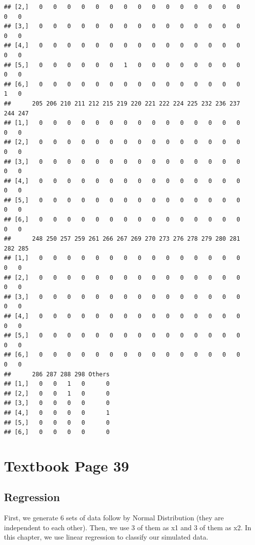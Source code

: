 \documentclass{article}\usepackage[]{graphicx}\usepackage[]{color}
\makeatletter
\newenvironment{kframe}{%
 \def\at@end@of@kframe{}%
 \ifinner\ifhmode%
  \def\at@end@of@kframe{\end{minipage}}%
  \begin{minipage}{\columnwidth}%
 \fi\fi%
 \def\FrameCommand##1{\hskip\@totalleftmargin \hskip-\fboxsep
 \colorbox{shadecolor}{##1}\hskip-\fboxsep
     \hskip-\linewidth \hskip-\@totalleftmargin \hskip\columnwidth}%
 \MakeFramed {\advance\hsize-\width
   \@totalleftmargin\z@ \linewidth\hsize
   \@setminipage}}%
 {\par\unskip\endMakeFramed%
 \at@end@of@kframe}
\newenvironment{knitrout}{}{} %
\makeatother
\begin{document}
\begin{knitrout}
\begin{kframe}
\begin{verbatim}
## [2,]   0   0   0   0   0   0   0   0   0   0   0   0   0   0   0   0   0
## [3,]   0   0   0   0   0   0   0   0   0   0   0   0   0   0   0   0   0
## [4,]   0   0   0   0   0   0   0   0   0   0   0   0   0   0   0   0   0
## [5,]   0   0   0   0   0   0   1   0   0   0   0   0   0   0   0   0   0
## [6,]   0   0   0   0   0   0   0   0   0   0   0   0   0   0   0   1   0
##      205 206 210 211 212 215 219 220 221 222 224 225 232 236 237 244 247
## [1,]   0   0   0   0   0   0   0   0   0   0   0   0   0   0   0   0   0
## [2,]   0   0   0   0   0   0   0   0   0   0   0   0   0   0   0   0   0
## [3,]   0   0   0   0   0   0   0   0   0   0   0   0   0   0   0   0   0
## [4,]   0   0   0   0   0   0   0   0   0   0   0   0   0   0   0   0   0
## [5,]   0   0   0   0   0   0   0   0   0   0   0   0   0   0   0   0   0
## [6,]   0   0   0   0   0   0   0   0   0   0   0   0   0   0   0   0   0
##      248 250 257 259 261 266 267 269 270 273 276 278 279 280 281 282 285
## [1,]   0   0   0   0   0   0   0   0   0   0   0   0   0   0   0   0   0
## [2,]   0   0   0   0   0   0   0   0   0   0   0   0   0   0   0   0   0
## [3,]   0   0   0   0   0   0   0   0   0   0   0   0   0   0   0   0   0
## [4,]   0   0   0   0   0   0   0   0   0   0   0   0   0   0   0   0   0
## [5,]   0   0   0   0   0   0   0   0   0   0   0   0   0   0   0   0   0
## [6,]   0   0   0   0   0   0   0   0   0   0   0   0   0   0   0   0   0
##      286 287 288 298 Others
## [1,]   0   0   1   0      0
## [2,]   0   0   1   0      0
## [3,]   0   0   0   0      0
## [4,]   0   0   0   0      1
## [5,]   0   0   0   0      0
## [6,]   0   0   0   0      0
\end{verbatim}
\end{kframe}
\end{knitrout}


\section{Textbook Page 39}
\label{sec:q2}

\subsection{Regression}
\label{sec:LinearRegression}

First, we generate 6 sets of data follow by Normal Distribution (they are independent to each other). Then, we use 3 of them as x1 and 3 of them as x2. 
In this chapter, we use linear regression to classify our simulated data.
\end{document}
